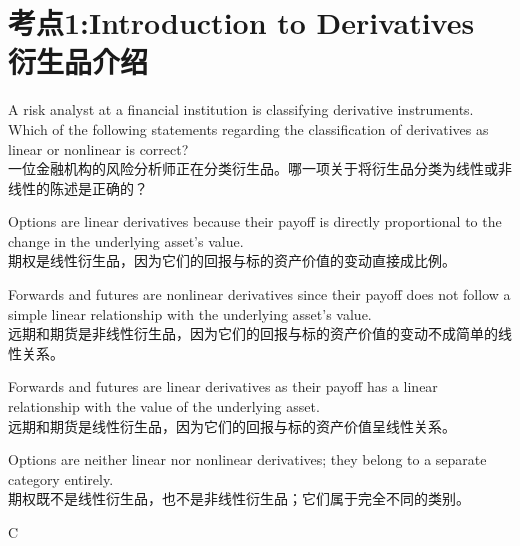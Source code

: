 \documentclass{article}
\newcounter{question} %
\begin{document}
 \tableofcontents %
\newpage




\section{考点1:Introduction to Derivatives 衍生品介绍}
\setcounter{question}{0}
\begin{question}
    A risk analyst at a financial institution is classifying derivative instruments. Which of the following statements regarding the classification of derivatives as linear or nonlinear is correct?\\
    一位金融机构的风险分析师正在分类衍生品。哪一项关于将衍生品分类为线性或非线性的陈述是正确的？
    \end{question}
    
    \begin{choices}
        \item Options are linear derivatives because their payoff is directly proportional to the change in the underlying asset's value.\\
        期权是线性衍生品，因为它们的回报与标的资产价值的变动直接成比例。
        \item Forwards and futures are nonlinear derivatives since their payoff does not follow a simple linear relationship with the underlying asset's value.\\
        远期和期货是非线性衍生品，因为它们的回报与标的资产价值的变动不成简单的线性关系。
        \item Forwards and futures are linear derivatives as their payoff has a linear relationship with the value of the underlying asset.\\
        远期和期货是线性衍生品，因为它们的回报与标的资产价值呈线性关系。
        \item Options are neither linear nor nonlinear derivatives; they belong to a separate category entirely.\\
        期权既不是线性衍生品，也不是非线性衍生品；它们属于完全不同的类别。
    \end{choices}
    
    \begin{correctanswer}
    C
    \end{correctanswer}
    
\end{document}
